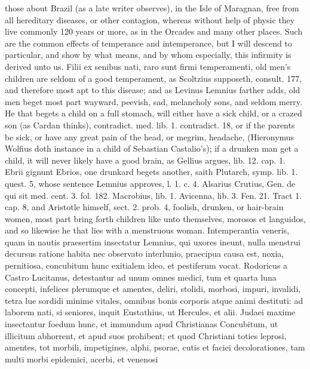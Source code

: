 {those about Brazil (as a late writer observes), in the Isle of
Maragnan, free from all hereditary diseases, or other contagion,
whereas without help of physic they live commonly 120 years or more, as
in the Orcades and many other places. Such are the common effects of
temperance and intemperance, but I will descend to particular, and show
by what means, and by whom especially, this infirmity is derived unto
us.
Filii ex senibus nati, raro sunt firmi temperamenti, old men's children
are seldom of a good temperament, as Scoltzius supposeth, consult. 177,
and therefore most apt to this disease; and as Levinus Lemnius
farther adds, old men beget most part wayward, peevish, sad, melancholy
sons, and seldom merry. He that begets a child on a full stomach, will
either have a sick child, or a crazed son (as Cardan thinks),
contradict. med. lib. 1. contradict. 18, or if the parents be sick, or
have any great pain of the head, or megrim, headache, (Hieronymus
Wolfius doth instance in a child of Sebastian Castalio's); if a
drunken man get a child, it will never likely have a good brain, as
Gellius argues, lib. 12. cap. 1. Ebrii gignunt Ebrios, one drunkard
begets another, saith Plutarch, symp. lib. 1. quest. 5, whose
sentence Lemnius approves, l. 1. c. 4. Alsarius Crutius, Gen. de
qui sit med. cent. 3. fol. 182. Macrobius, lib. 1. Avicenna, lib. 3.
Fen. 21. Tract 1. cap. 8, and Aristotle himself, sect. 2. prob. 4,
foolish, drunken, or hair-brain women, most part bring forth children
like unto themselves, morosos et languidos, and so likewise he that
lies with a menstruous woman. Intemperantia veneris, quam in nautis
praesertim insectatur  Lemnius, qui uxores ineunt, nulla menstrui
decursus ratione habita nec observato interlunio, praecipua causa est,
noxia, pernitiosa, concubitum hunc exitialem ideo, et pestiferum vocat.
Rodoricus a Castro Lucitanus, detestantur ad unum omnes medici,
tum et quarta luna concepti, infelices plerumque et amentes, deliri,
stolidi, morbosi, impuri, invalidi, tetra lue sordidi minime vitales,
omnibus bonis corporis atque animi destituti: ad laborem nati, si
seniores, inquit Eustathius, ut Hercules, et alii. Judaei maxime
insectantur foedum hunc, et immundum apud Christianas Concubitum, ut
illicitum abhorrent, et apud suos prohibent; et quod Christiani toties
leprosi, amentes, tot morbili, impetigines, alphi, psorae, cutis et
faciei decolorationes, tam multi morbi epidemici, acerbi, et venenosi
}

